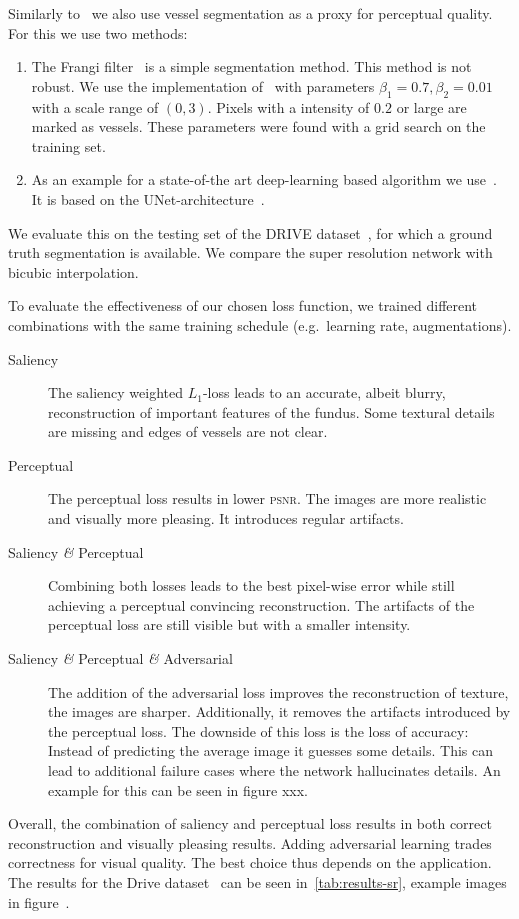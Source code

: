 \documentclass{scrartcl}
\begin{document}
Similarly to~\cite{SaliencyGAN} we also use vessel segmentation as a proxy for perceptual quality.
For this we use two methods:
\begin{enumerate}
  \item The Frangi filter~\cite{Frangi} is a simple segmentation method.
  This method is not robust.
  We use the implementation of~\cite{Scikit-image} with parameters $\beta_1 = 0.7, \beta_2=0.01$ with a scale range of $(0, 3)$.
  Pixels with a intensity of $0.2$ or large are marked as vessels.
  These parameters were found with a grid search on the training set.
\item As an example for a state-of-the art deep-learning based algorithm we use~\cite{RetinaUnet}.
  It is based on the UNet-architecture~\cite{Unet}.
\end{enumerate}
We evaluate this on the testing set of the DRIVE dataset~\cite{Drive}, for which a ground truth segmentation is available.
We compare the super resolution network with bicubic interpolation.

To evaluate the effectiveness of our chosen loss function, we trained different combinations with the same training schedule (e.g.\ learning rate, augmentations).
\begin{description}
\item[Saliency] The saliency weighted $L_1$-loss leads to an accurate, albeit blurry, reconstruction of important features of the fundus.
  Some textural details are missing and edges of vessels are not clear.
\item[Perceptual] The perceptual loss results in lower \textsc{psnr}.
  The images are more realistic and visually more pleasing.
  It introduces regular artifacts.
\item[Saliency \textit{\&} Perceptual] Combining both losses leads to the best pixel-wise error while still achieving a perceptual convincing reconstruction.
  The artifacts of the perceptual loss are still visible but with a smaller intensity.
\item[Saliency \textit{\&} Perceptual \textit{\&} Adversarial]
  The addition of the adversarial loss improves the reconstruction of texture, the images are sharper.
  Additionally, it removes the artifacts introduced by the perceptual loss.
  The downside of this loss is the loss of accuracy:
  Instead of predicting the average image it guesses some details.
  This can lead to additional failure cases where the network hallucinates details.
  An example for this can be seen in figure xxx.
\end{description}
Overall, the combination of saliency and perceptual loss results in both correct reconstruction and visually pleasing results.
Adding adversarial learning trades correctness for visual quality.
The best choice thus depends on the application.
The results for the Drive dataset~\cite{Drive} can be seen in~\cref{tab:results-sr}, example images in figure~.
\end{document}

